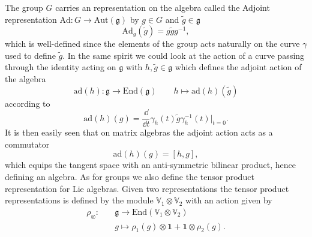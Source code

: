 The group $G$ carries an representation on the algebra called the Adjoint representation $\text{Ad}: G\to \text{Aut}(\mathfrak{g})$ by $g\in G$ and $\tilde{g}\in\mathfrak{g}$
\begin{equation}\label{eq:Liegrouprep}
    \text{Ad}_g(\tilde{g}) = g\tilde{g}g^{-1},
\end{equation}
which is well-defined since the elements of the group acts naturally on the curve $\gamma$ used to define $\tilde{g}$. In the same spirit we could look at the action of a curve passing through the identity acting on $\mathfrak{g}$ with $h,\tilde{g}\in \mathfrak{g}$ which defines the adjoint action of the algebra 
\begin{equation}
    \text{ad}(h): \mathfrak{g}\to \text{End}(\mathfrak{g})\qquad h\mapsto \text{ad}(h)(\tilde{g})
\end{equation}
according to 
\begin{equation}
    \text{ad}(h)(g) = \frac{\dd}{\dd t}\gamma_h(t)\tilde{g}\gamma_h^{-1}(t)|_{t=0}.
\end{equation}
It is then easily seen that on matrix algebras the adjoint action acts as a commutator 
\begin{equation}
    \text{ad}(h)(g) = [h,g],
\end{equation}
which equips the tangent space with an anti-symmetric bilinear product, hence defining an algebra. As for groups we also define the tensor product representation for Lie algebras. Given two representations the tensor product representations is defined by the module $\mathbb{V}_1\otimes\mathbb{V}_2$ with an action given by 
\begin{equation}
    \begin{aligned}
        \rho_\otimes:\quad &\mathfrak{g}\to\text{End}\left(\mathbb{V}_1\otimes\mathbb{V}_2\right) \\
                & g\mapsto \rho_1(g)\otimes \mathbf{1}+\mathbf{1}\otimes\rho_2(g).
    \end{aligned}
\end{equation}


